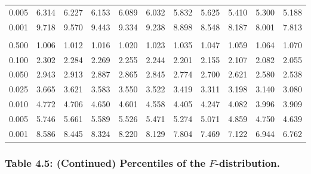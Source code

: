 \documentclass[
]{article}
\begin{document}
\begin{longtable}[t]{lrrrrrrrrrr}
\hspace{1em}0.005 & 6.314 & 6.227 & 6.153 & 6.089 & 6.032 & 5.832 & 5.625 & 5.410 & 5.300 & 5.188\\
\hspace{1em}0.001 & 9.718 & 9.570 & 9.443 & 9.334 & 9.238 & 8.898 & 8.548 & 8.187 & 8.001 & 7.813\\
\addlinespace[0.3em]
\multicolumn{11}{l}{\textbf{$k_2=10$}}\\
\hspace{1em}0.500 & 1.006 & 1.012 & 1.016 & 1.020 & 1.023 & 1.035 & 1.047 & 1.059 & 1.064 & 1.070\\
\hspace{1em}0.100 & 2.302 & 2.284 & 2.269 & 2.255 & 2.244 & 2.201 & 2.155 & 2.107 & 2.082 & 2.055\\
\hspace{1em}0.050 & 2.943 & 2.913 & 2.887 & 2.865 & 2.845 & 2.774 & 2.700 & 2.621 & 2.580 & 2.538\\
\hspace{1em}0.025 & 3.665 & 3.621 & 3.583 & 3.550 & 3.522 & 3.419 & 3.311 & 3.198 & 3.140 & 3.080\\
\hspace{1em}0.010 & 4.772 & 4.706 & 4.650 & 4.601 & 4.558 & 4.405 & 4.247 & 4.082 & 3.996 & 3.909\\
\hspace{1em}0.005 & 5.746 & 5.661 & 5.589 & 5.526 & 5.471 & 5.274 & 5.071 & 4.859 & 4.750 & 4.639\\
\hspace{1em}0.001 & 8.586 & 8.445 & 8.324 & 8.220 & 8.129 & 7.804 & 7.469 & 7.122 & 6.944 & 6.762\\
\bottomrule
\end{longtable}

\newpage

\subsubsection{\texorpdfstring{Table 4.5: (Continued) Percentiles of the
\(F\)-distribution.}{Table 4.5: (Continued) Percentiles of the F-distribution.}}\label{table-4.5-continued-percentiles-of-the-f-distribution.}
\end{document}
